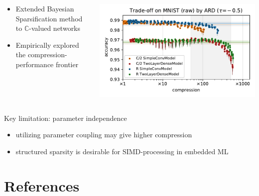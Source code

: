 \documentclass{beamer}
\newcommand{\cplx}{\mathbb{C}}
\begin{document}
\begin{frame}[c]{\insertsection}
  \begin{columns}[T]
    \begin{column}{0.38\textwidth}
      \begin{itemize}
        \item Extended Bayesian Sparsification method to $\cplx$-valued networks
        \item Empirically explored the compression-performance frontier
      \end{itemize}
    \end{column}
    \begin{column}{0.58\textwidth}
      \includegraphics[scale=0.35,clip]{figure__mnist-like__trade-off/appendix__cmp__ARD__mnist__raw__-0.5.pdf}
    \end{column}
  \end{columns}

  \bigskip
  Key limitation: parameter independence %
  \begin{itemize}
    \item utilizing parameter coupling may give higher compression
    \item structured sparsity is desirable for SIMD-processing in embedded ML
  \end{itemize}

\end{frame}


\section{References} %
\label{sec:references}

\begin{frame}[c,shrink=35,noframenumbering,plain]{\insertsection}
  
  
\end{frame}

\end{document}
